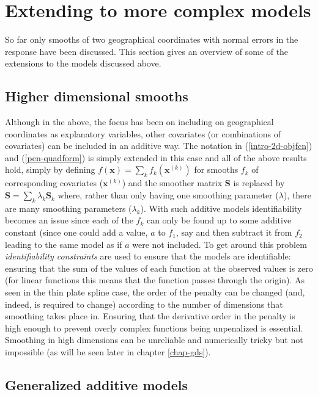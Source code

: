 \section{Extending to more complex models}
\label{intro-extending}

So far only smooths of two geographical coordinates with normal errors in the response have been discussed. This section gives an overview of some of the extensions to the models discussed above.

\subsection{Higher dimensional smooths}

Although in the above, the focus has been on including on geographical coordinates as explanatory variables, other covariates (or combinations of covariates) can be included in an additive way. The notation in (\ref{intro-2d-objfcn}) and (\ref{pen-quadform}) is simply extended in this case and all of the above results hold, simply by defining $f(\mathbf{x})=\sum_k f_k(\mathbf{x}^{(k)})$ for smooths $f_k$ of corresponding covariates ($\mathbf{x}^{(k)}$) and the smoother matrix $\mathbf{S}$ is replaced by $\mathbf{S}= \sum_k \lambda_k \mathbf{S}_k$ where, rather than only having one smoothing parameter ($\lambda$), there are many smoothing parameters ($\lambda_k$). With such additive models identifiability becomes an issue since each of the $f_k$ can only be found up to some additive constant (since one could add a value, $a$ to $f_1$, say and then subtract it from $f_2$ leading to the same model as if $a$ were not included. To get around this problem \textit{identifiability constraints} are used to ensure that the models are identifiable: ensuring that the sum of the values of each function at the observed values is zero (for linear functions this means that the function passes through the origin). As seen in the thin plate spline case, the order of the penalty can be changed (and, indeed, is required to change) according to the number of dimensions that smoothing takes place in. Ensuring that the derivative order in the penalty is high enough to prevent overly complex functions being unpenalized is essential. Smoothing in high dimensions can be unreliable and numerically tricky but not impossible (as will be seen later in chapter \ref{chap-gds}).

\subsection{Generalized additive models}
\label{intro-extending-gams}


